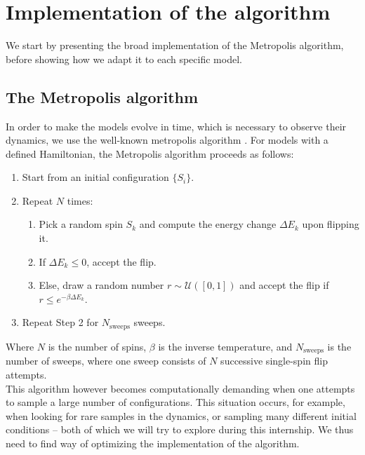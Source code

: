 \section{Implementation of the algorithm}
We start by presenting the broad implementation of the Metropolis algorithm, before showing how we adapt it to each specific model.
\subsection{The Metropolis algorithm}
\myindent In order to make the models evolve in time, which is necessary to observe their dynamics, we use the well-known metropolis algorithm \cite{Metropolis1953}. For models with a defined Hamiltonian, the Metropolis algorithm proceeds as follows:
\begin{enumerate}
    \item Start from an initial configuration $\{S_i\}$.
    \item Repeat $N$ times:
    \begin{enumerate}[label=\alph*.]
        \item Pick a random spin $S_k$ and compute the energy change $\Delta E_k$
              upon flipping it.
        \item If $\Delta E_k \leq 0$, accept the flip.
        \item Else, draw a random number $r \sim \mathcal{U}([0,1])$
              and accept the flip if $r \leq e^{-\beta \Delta E_k}$.
    \end{enumerate}
    \item Repeat Step 2 for $N_{\text{sweeps}}$ sweeps.
\end{enumerate}
Where $N$ is the number of spins, $\beta$ is the inverse temperature,
and $N_{\text{sweeps}}$ is the number of sweeps, where one sweep consists of
$N$ successive single-spin flip attempts.\\
This algorithm however becomes computationally demanding when one attempts to sample a large number of configurations. This situation occurs, for example, when looking for rare samples in the dynamics, or sampling many different initial conditions -- both of which we will try to explore during this internship. We thus need to find way of optimizing the implementation of the algorithm.

